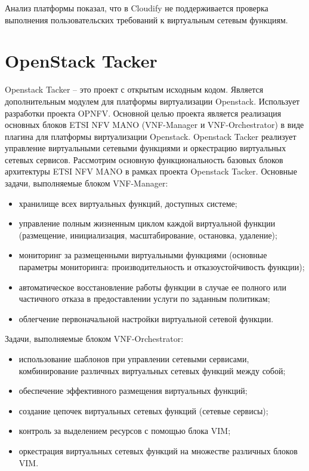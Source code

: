 \documentclass[oneside,final,14pt,a4paper]{extreport}
\begin{document}
Анализ платформы показал, что в Cloudify не поддерживается проверка выполнения пользовательских требований к виртуальным сетевым функциям.


\section{OpenStack Tacker}
Openstack Tacker\cite{bib:openstack-tacker} -- это проект с открытым исходным кодом. Является дополнительным модулем для платформы виртуализации Openstack. Использует разработки проекта OPNFV. Основной целью проекта является реализация основных блоков ETSI NFV MANO\cite{bib:etsi-nfv-mano} (VNF-Manager и VNF-Orchestrator) в виде плагина для платформы виртуализации Openstack. Openstack Tacker реализует управление виртуальными сетевыми функциями и оркестрацию виртуальных сетевых сервисов.
	Рассмотрим основную функциональность базовых блоков архитектуры ETSI NFV MANO в рамках проекта Openstack Tacker. Основные задачи, выполняемые блоком VNF-Manager:
\begin{itemize}
	\item хранилище всех виртуальных функций, доступных системе;
	\item управление полным жизненным циклом каждой виртуальной функции (размещение, инициализация, масштабирование, остановка, удаление);
	\item мониторинг за размещенными виртуальными функциями (основные параметры мониторинга: производительность и отказоустойчивость функции);
	\item автоматическое восстановление работы функции в случае ее полного или частичного отказа в предоставлении услуги по заданным политикам;
	\item облегчение первоначальной настройки виртуальной сетевой функции.
\end{itemize}

Задачи, выполняемые блоком VNF-Orchestrator:
\begin{itemize}
	\item использование шаблонов при управлении сетевыми сервисами, комбинирование различных виртуальных сетевых функций между собой;
	\item обеспечение эффективного размещения виртуальных функций;
	\item создание цепочек виртуальных сетевых функций (сетевые сервисы);
	\item контроль за выделением ресурсов с помощью блока VIM;
	\item оркестрация виртуальных сетевых функций на множестве различных блоков VIM.
\end{itemize}
\end{document}
